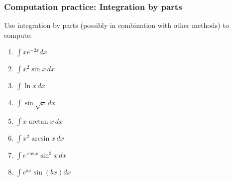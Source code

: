 \documentclass[14pt]{beamer}
\newcommand{\p}{\pause}
\newcommand{\vv}{\vspace{.2cm}}
\begin{document}
	\begin{frame}[t]
		\frametitle{Computation practice: Integration by parts}

		Use integration by parts (possibly in combination with other methods) to
		compute:
		\begin{multicols}{2}
			\begin{enumerate}
				\item ${\displaystyle  \int x e^{-2x} dx }$ \vv

				\item ${\displaystyle \int x^2 \sin x \, dx}$ \vv

				\item ${\displaystyle \int \ln x \, dx}$ \vv

				\item ${\displaystyle \int \sin \sqrt{x} \, dx}$ \vv \p

				\item ${\displaystyle \int x \arctan x \, dx}$ \vv

				\item ${\displaystyle \int x^2 \arcsin x \, dx}$ \vv

				\item ${\displaystyle \int e^{\cos x} \sin^3 x \, dx}$ \vv

				\item ${\displaystyle \int e^{ax} \sin (bx) dx}$ \vv
			\end{enumerate}
		\end{multicols}
	\end{frame}
\end{document}
